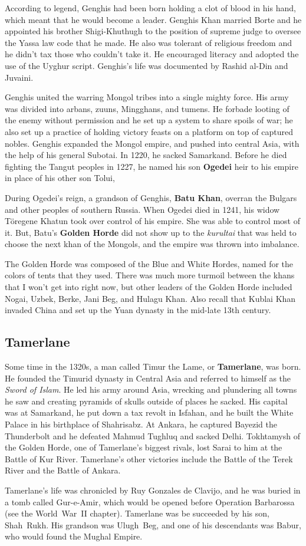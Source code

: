 According to legend, Genghis had been born holding a clot of blood in his hand,
which meant that he would become a leader.
Genghis Khan married Borte and he appointed his brother Shigi-Khuthugh to the position of supreme judge
to oversee the Yassa law code that he made.
He also was tolerant of religious freedom and he didn't tax those who couldn't take it.
He encouraged literacy and adopted the use of the Uyghur script.
Genghis's life was documented by Rashid al-Din and Juvaini.

Genghis united the warring Mongol tribes into a single mighty force.
His army was divided into arbans, zuuns, Mingghans, and tumens.
He forbade looting of the enemy without permission and he set up a system to share spoils of war;
he also set up a practice of holding victory feasts on a platform on top of captured nobles.
Genghis expanded the Mongol empire, and pushed into central Asia, with the help of his general Subotai.
In 1220, he sacked Samarkand.
Before he died fighting the Tangut peoples in 1227,
he named his son \textbf{Ogedei} heir to his empire in place of his other son Tolui,

During Ogedei's reign, a grandson of Genghis, \textbf{Batu Khan},
overran the Bulgars and other peoples of southern Russia.
When Ogedei died in 1241, his widow T\"oregene Khatun took over control of his empire.
She was able to control most of it.
But, Batu's \textbf{Golden Horde} did not show up to the
\textit{kurultai} that was held to choose the next khan of the Mongols,
and the empire was thrown into imbalance.

The Golden Horde was composed of the Blue and White Hordes, named for the colors of tents that they used.
There was much more turmoil between the khans that I won't get into right now,
but other leaders of the Golden Horde included Nogai, Uzbek, Berke, Jani Beg, and Hulagu Khan.
Also recall that Kublai Khan invaded China and set up the Yuan dynasty in the mid-late 13th century.

\subsection*{Tamerlane}

Some time in the 1320s, a man called Timur the Lame, or \textbf{Tamerlane}, was born.
He founded the Timurid dynasty in Central Asia and referred to himself as the \textit{Sword of Islam}.
He led his army around Asia,
wrecking and plundering all towns he saw and creating pyramids of skulls outside of places he sacked.
His capital was at Samarkand, he put down a tax revolt in Isfahan,
and he built the White Palace in his birthplace of Shahrisabz.
At Ankara, he captured Bayezid the Thunderbolt and he defeated Mahmud Tughluq and sacked Delhi.
Tokhtamysh of the Golden Horde, one of Tamerlane's biggest rivals, lost Sarai to him at the Battle of Kur River.
Tamerlane's other victories include the Battle of the Terek River and the Battle of Ankara.

Tamerlane's life was chronicled by Ruy Gonzales de Clavijo, and he was buried in a tomb called Gur-e-Amir,
which would be opened before Operation Barbarossa (see the World~War~II chapter).
Tamerlane was be succeeded by his son, Shah~Rukh.
His grandson was Ulugh~Beg, and one of his descendants was Babur, who would found the Mughal Empire.
